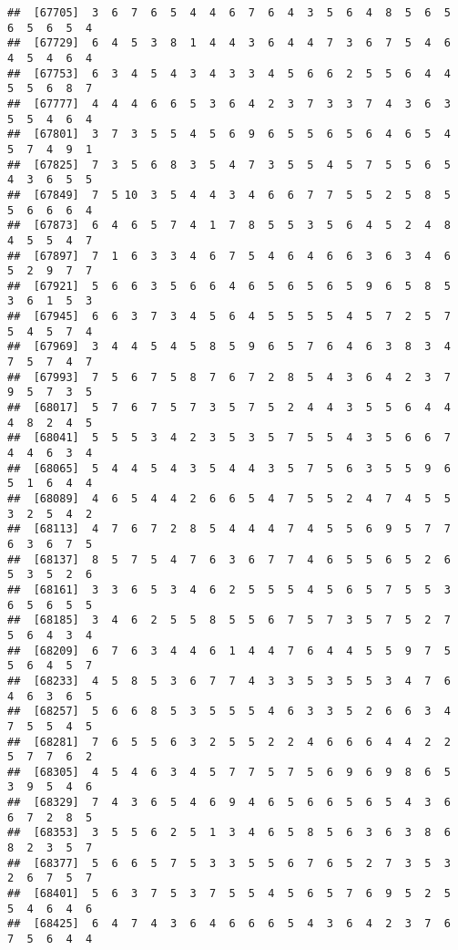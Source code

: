 \documentclass[
]{book}
\begin{document}
\begin{verbatim}
##  [67705]  3  6  7  6  5  4  4  6  7  6  4  3  5  6  4  8  5  6  5  6  5  6  5  4
##  [67729]  6  4  5  3  8  1  4  4  3  6  4  4  7  3  6  7  5  4  6  4  5  4  6  4
##  [67753]  6  3  4  5  4  3  4  3  3  4  5  6  6  2  5  5  6  4  4  5  5  6  8  7
##  [67777]  4  4  4  6  6  5  3  6  4  2  3  7  3  3  7  4  3  6  3  5  5  4  6  4
##  [67801]  3  7  3  5  5  4  5  6  9  6  5  5  6  5  6  4  6  5  4  5  7  4  9  1
##  [67825]  7  3  5  6  8  3  5  4  7  3  5  5  4  5  7  5  5  6  5  4  3  6  5  5
##  [67849]  7  5 10  3  5  4  4  3  4  6  6  7  7  5  5  2  5  8  5  5  6  6  6  4
##  [67873]  6  4  6  5  7  4  1  7  8  5  5  3  5  6  4  5  2  4  8  4  5  5  4  7
##  [67897]  7  1  6  3  3  4  6  7  5  4  6  4  6  6  3  6  3  4  6  5  2  9  7  7
##  [67921]  5  6  6  3  5  6  6  4  6  5  6  5  6  5  9  6  5  8  5  3  6  1  5  3
##  [67945]  6  6  3  7  3  4  5  6  4  5  5  5  5  4  5  7  2  5  7  5  4  5  7  4
##  [67969]  3  4  4  5  4  5  8  5  9  6  5  7  6  4  6  3  8  3  4  7  5  7  4  7
##  [67993]  7  5  6  7  5  8  7  6  7  2  8  5  4  3  6  4  2  3  7  9  5  7  3  5
##  [68017]  5  7  6  7  5  7  3  5  7  5  2  4  4  3  5  5  6  4  4  4  8  2  4  5
##  [68041]  5  5  5  3  4  2  3  5  3  5  7  5  5  4  3  5  6  6  7  4  4  6  3  4
##  [68065]  5  4  4  5  4  3  5  4  4  3  5  7  5  6  3  5  5  9  6  5  1  6  4  4
##  [68089]  4  6  5  4  4  2  6  6  5  4  7  5  5  2  4  7  4  5  5  3  2  5  4  2
##  [68113]  4  7  6  7  2  8  5  4  4  4  7  4  5  5  6  9  5  7  7  6  3  6  7  5
##  [68137]  8  5  7  5  4  7  6  3  6  7  7  4  6  5  5  6  5  2  6  5  3  5  2  6
##  [68161]  3  3  6  5  3  4  6  2  5  5  5  4  5  6  5  7  5  5  3  6  5  6  5  5
##  [68185]  3  4  6  2  5  5  8  5  5  6  7  5  7  3  5  7  5  2  7  5  6  4  3  4
##  [68209]  6  7  6  3  4  4  6  1  4  4  7  6  4  4  5  5  9  7  5  5  6  4  5  7
##  [68233]  4  5  8  5  3  6  7  7  4  3  3  5  3  5  5  3  4  7  6  4  6  3  6  5
##  [68257]  5  6  6  8  5  3  5  5  5  4  6  3  3  5  2  6  6  3  4  7  5  5  4  5
##  [68281]  7  6  5  5  6  3  2  5  5  2  2  4  6  6  6  4  4  2  2  5  7  7  6  2
##  [68305]  4  5  4  6  3  4  5  7  7  5  7  5  6  9  6  9  8  6  5  3  9  5  4  6
##  [68329]  7  4  3  6  5  4  6  9  4  6  5  6  6  5  6  5  4  3  6  6  7  2  8  5
##  [68353]  3  5  5  6  2  5  1  3  4  6  5  8  5  6  3  6  3  8  6  8  2  3  5  7
##  [68377]  5  6  6  5  7  5  3  3  5  5  6  7  6  5  2  7  3  5  3  2  6  7  5  7
##  [68401]  5  6  3  7  5  3  7  5  5  4  5  6  5  7  6  9  5  2  5  5  4  6  4  6
##  [68425]  6  4  7  4  3  6  4  6  6  6  5  4  3  6  4  2  3  7  6  7  5  6  4  4

\end{verbatim}
\end{document}
